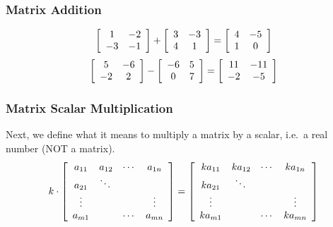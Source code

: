 \documentclass[xcolor=dvipsnames]{beamer}
\begin{document}
\begin{frame}
  \frametitle{Matrix Addition}
  \begin{equation}
    \label{eq:pahleuza}
    \left[
      \begin{array}{cc}
        1 & -2 \\
        -3 & -1 
      \end{array}\right]+\left[
      \begin{array}{cc}
        3 & -3 \\
        4 & 1
      \end{array}\right]=\left[
      \begin{array}{cc}
        4 & -5 \\
        1 & 0
      \end{array}\right]\notag
  \end{equation}
  \begin{equation}
    \label{eq:euquolux}
    \left[
      \begin{array}{cc}
        5 & -6 \\
        -2 & 2 
      \end{array}\right]-\left[
      \begin{array}{cc}
        -6 & 5 \\
        0 & 7
      \end{array}\right]=\left[
      \begin{array}{cc}
        11 & -11 \\
        -2 & -5
      \end{array}\right]\notag
  \end{equation}
\end{frame}

\begin{frame}
  \frametitle{Matrix Scalar Multiplication}
Next, we define what it means to multiply a matrix by a \alert{scalar}, i.e.\
a real number (NOT a matrix). 
\begin{equation}
  \label{eq:theishie}
  k\cdot\left[\begin{array}{cccc}
    a_{11}&a_{12}&\cdots{}&a_{1n} \\
          a_{21}&\ddots{}&& \\
          \vdots{}&&&\vdots \\
          a_{m1}&&\cdots{}&a_{mn}
  \end{array}\right]=\left[\begin{array}{cccc}
    ka_{11}&ka_{12}&\cdots{}&ka_{1n} \\
          ka_{21}&\ddots{}&& \\
          \vdots{}&&&\vdots \\
          ka_{m1}&&\cdots{}&ka_{mn}
  \end{array}\right]\notag
\end{equation}
\end{frame}
\end{document}
